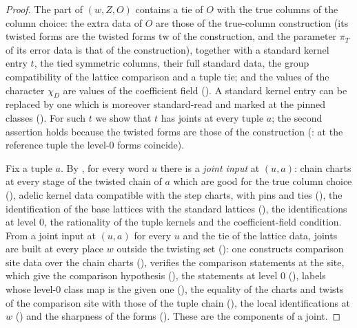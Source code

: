 \begin{proof}
The part of $(w,Z,O)$ contains a tie of $O$ with the true columns of the column choice: the extra data of $O$ are those of
the true-column construction (its twisted forms are the twisted forms $\mathrm{tw}$ of the construction, and the
parameter $\pi_T$ of its error data is that of the construction), together with a standard kernel entry $t$, the tied symmetric columns, their full
standard data, the group compatibility of the lattice comparison and a tuple tie; and the values of the character
$\chi_D$ are values of the coefficient field (). A standard
kernel entry can be replaced by one which is moreover standard-read and marked at the pinned classes
(). For such $t$ we show that $t$ has joints at every tuple $a$; the second
assertion holds because the twisted forms are those of the construction
(: at the reference tuple the level-$0$ forms coincide).

Fix a tuple $a$. By , for every word $u$ there
is a \emph{joint input} at $(u,a)$: chain charts at every stage of the twisted chain of $a$ which are good for the true
column choice (), adelic kernel data compatible with
the step charts, with pins and ties (), the
identification of the base lattices with the standard lattices
(), the identifications at level $0$, the
rationality of the tuple kernels and the coefficient-field condition. From a joint input at $(u,a)$ for every $u$ and the
tie of the lattice data, joints are built at every place $w$ outside the twisting set
(): one constructs comparison site data over
the chain charts (), verifies the comparison
statements at the site, which give the comparison hypothesis
(), the statements at level $0$
(), labels whose level-$0$ class map is the given one
(), the equality of the charts and twists of the
comparison site with those of the tuple chain (),
the local identifications at $w$ () and the sharpness of
the forms (). These are the components of a joint.
\end{proof}

